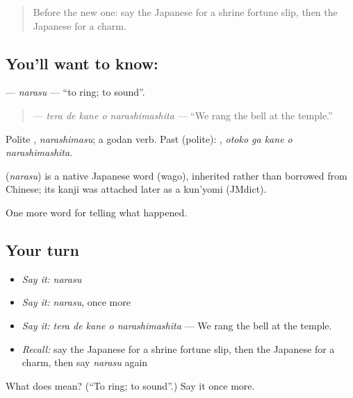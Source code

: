 \begin{quote}
Before the new one: say the Japanese for a shrine fortune slip, then the Japanese for a charm.
\end{quote}

\subsection*{You'll want to know: }
\textbf{} — \emph{narasu} — \textquotedblleft{}to ring; to sound\textquotedblright{}.

\begin{quote}
\textbf{  } — \emph{tera de kane o narashimashita} — \textquotedblleft{}We rang the bell at the temple.\textquotedblright{}
\end{quote}

Polite \textbf{}, \emph{narashimasu}; a godan verb. Past (polite): \textbf{  }, \emph{otoko ga kane o narashimashita}.

\begin{cousinweb}
\textbf{} (\emph{narasu}) is a native Japanese word (wago), inherited rather than borrowed from Chinese; its kanji was attached later as a kun'yomi (JMdict).
\end{cousinweb}

\begin{grammarlens}[title={What you've built}]
One more word for telling what happened.
\end{grammarlens}

\subsection*{Your turn}
\begin{itemize}
\raggedright
  \item \emph{Say it:} \emph{narasu}
  \item \emph{Say it:} \emph{narasu}, once more
  \item \emph{Say it:} \emph{tera de kane o narashimashita} — We rang the bell at the temple.
  \item \emph{Recall:} say the Japanese for a shrine fortune slip, then the Japanese for a charm, then say \emph{narasu} again
\end{itemize}

\begin{tcolorbox}[breakable,colback=teal!4,colframe=teal!35!black,title={Before you move on}]
What does  mean? (\textquotedblleft{}To ring; to sound\textquotedblright{}.) Say it once more.
\end{tcolorbox}
